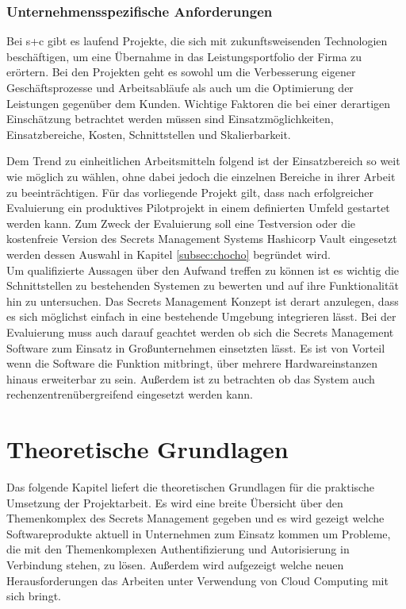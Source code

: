 \documentclass[
book,
a4paper,   
titlepage,  
halfparskip,
12pt        
]{scrartcl}
\begin{document}
\begin{onehalfspacing}
\subsubsection{Unternehmensspezifische Anforderungen}
Bei s+c gibt es laufend Projekte, die sich mit zukunftsweisenden Technologien beschäftigen, um eine Übernahme in das Leistungsportfolio der Firma zu erörtern. Bei den Projekten geht es sowohl um die Verbesserung eigener Geschäftsprozesse und Arbeitsabläufe als auch um die Optimierung der Leistungen gegenüber dem Kunden. Wichtige Faktoren die bei einer derartigen Einschätzung betrachtet werden müssen sind Einsatzmöglichkeiten, Einsatzbereiche, Kosten, Schnittstellen und Skalierbarkeit. 
                                                                                                          
Dem Trend zu einheitlichen Arbeitsmitteln folgend ist der Einsatzbereich so weit wie möglich zu wählen, ohne dabei jedoch die einzelnen Bereiche in ihrer Arbeit zu beeinträchtigen. Für das vorliegende Projekt gilt, dass nach erfolgreicher Evaluierung ein produktives Pilotprojekt in einem definierten Umfeld gestartet werden kann. Zum Zweck der Evaluierung soll eine Testversion oder die kostenfreie Version des Secrets Management Systems Hashicorp Vault eingesetzt werden dessen Auswahl in Kapitel \vref{subsec:chocho} begründet wird.\\
Um qualifizierte Aussagen über den Aufwand treffen zu können ist es wichtig die Schnittstellen zu bestehenden Systemen zu bewerten und auf ihre Funktionalität hin zu untersuchen. Das Secrets Management Konzept ist derart anzulegen, dass es sich möglichst einfach in eine bestehende Umgebung integrieren lässt. Bei der Evaluierung muss auch darauf geachtet werden ob sich die Secrets Management Software zum Einsatz in Großunternehmen einsetzten lässt. Es ist von Vorteil wenn die Software die Funktion mitbringt, über mehrere Hardwareinstanzen hinaus erweiterbar zu sein. Außerdem ist zu betrachten ob das System auch rechenzentrenübergreifend eingesetzt werden kann.

\newpage
\section{Theoretische Grundlagen}
\label{sec:grund}
Das folgende Kapitel liefert die theoretischen Grundlagen für die praktische Umsetzung der Projektarbeit. Es wird eine breite Übersicht über den Themenkomplex des Secrets Management gegeben und es wird gezeigt welche Softwareprodukte aktuell in Unternehmen zum Einsatz kommen um Probleme, die mit den Themenkomplexen Authentifizierung und Autorisierung in Verbindung stehen, zu lösen. Außerdem wird aufgezeigt welche neuen Herausforderungen das Arbeiten unter Verwendung von Cloud Computing mit sich bringt. 


\end{onehalfspacing}
\end{document}

